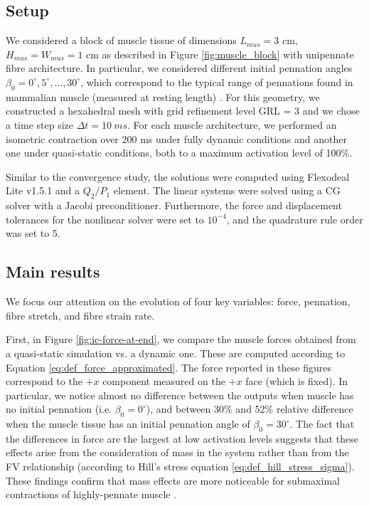 \documentclass{sfuthesis}
\numberwithin{equation}{section}
\numberwithin{figure}{chapter}
\numberwithin{table}{chapter}
\theoremstyle{definition}
\begin{document}
\subsection{Setup}

We considered a block of muscle tissue of dimensions $L_{mus}=3$ cm, $H_{mus}=W_{mus}=1$ cm as described in Figure \ref{fig:muscle_block} with unipennate fibre architecture. In particular, we considered different initial pennation angles $\beta_0 = 0^\circ, 5^\circ, \dots, 30^\circ$, which correspond to the typical range of pennations found in mammalian muscle (measured at resting length) \cite{LieberFriden2000}. For this geometry, we constructed a hexahedral mesh with grid refinement level GRL = 3 and we chose a time step size $\Delta t = 10 \ \si{ms}$. For each muscle architecture, we performed an isometric contraction over 200 ms under fully dynamic conditions and another one under quasi-static conditions, both to a maximum activation level of 100\%.

Similar to the convergence study, the solutions were computed using Flexodeal Lite v1.5.1 and a $Q_2/P_1$ element. The linear systems were solved using a CG solver with a Jacobi preconditioner. Furthermore, the force and displacement tolerances for the nonlinear solver were set to $10^{-4}$, and the quadrature rule order was set to 5.

\subsection{Main results}

We focus our attention on the evolution of four key variables: force, pennation, fibre stretch, and fibre strain rate. 

First, in Figure \ref{fig:ic-force-at-end}, we compare the muscle forces obtained from a quasi-static simulation vs. a dynamic one. These are computed according to Equation \eqref{eq:def_force_approximated}. The force reported in these figures correspond to the $+x$ component measured on the $+x$ face (which is fixed). In particular, we notice almost no difference between the outputs when muscle has no initial pennation (i.e. $\beta_0 = 0^\circ$), and between 30\% and 52\% relative difference when the muscle tissue has an initial pennation angle of $\beta_0 = 30^\circ$. The fact that the differences in force are the largest at low activation levels suggests that these effects arise from the consideration of mass in the system rather than from the FV relationship (according to Hill's stress equation \eqref{eq:def_hill_stress_sigma}). These findings confirm that mass effects are more noticeable for submaximal contractions of highly-pennate muscle \cite{Paper1_WakelingEtAl2020}.
\end{document}
